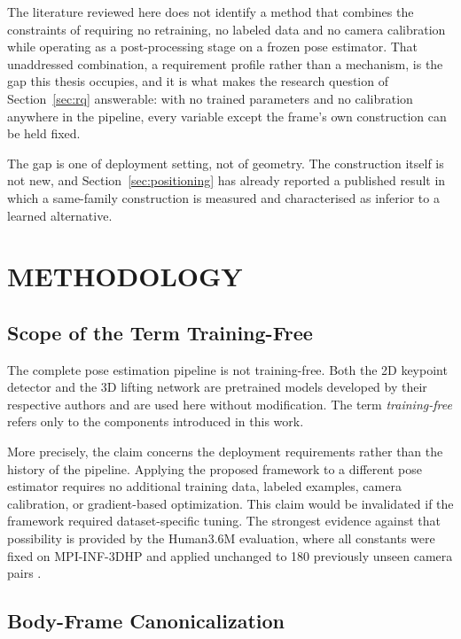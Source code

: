 \documentclass[12pt,a4paper]{report}
\begin{document}
The literature reviewed here does not identify a method that combines the constraints of
requiring no retraining, no labeled data and no camera calibration while operating as a
post-processing stage on a frozen pose estimator. That unaddressed combination, a
requirement profile rather than a mechanism, is the gap this thesis occupies, and it is
what makes the research question of Section~\ref{sec:rq} answerable: with no trained
parameters and no calibration anywhere in the pipeline, every variable except the frame's
own construction can be held fixed.

The gap is one of deployment setting, not of geometry. The construction itself is not
new, and Section~\ref{sec:positioning} has already reported a published result in which a
same-family construction is measured and characterised as inferior to a learned
alternative.

\chapter{METHODOLOGY}
\label{ch:method}

\section{Scope of the Term Training-Free}

The complete pose estimation pipeline is not training-free. Both the 2D keypoint detector \cite{yolov8} and the 3D lifting network \cite{motionagformer,motionbert} are pretrained models developed by their respective authors and are used here without modification. The term \emph{training-free} refers only to the components introduced in this work.

More precisely, the claim concerns the deployment requirements rather than the history of the pipeline. Applying the proposed framework to a different pose estimator requires no additional training data, labeled examples, camera calibration, or gradient-based optimization. This claim would be invalidated if the framework required dataset-specific tuning. The strongest evidence against that possibility is provided by the Human3.6M evaluation, where all constants were fixed on MPI-INF-3DHP \cite{mpi} and applied unchanged to 180 previously unseen camera pairs \cite{h36m}.

\section{Body-Frame Canonicalization}
\end{document}
